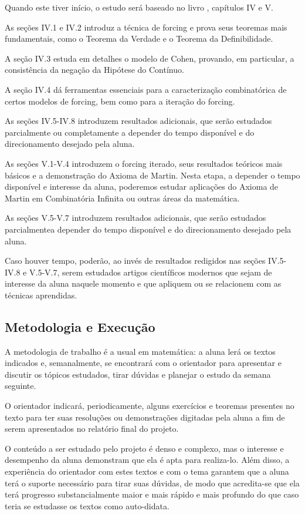 \documentclass{article}
\begin{document}
    Quando este tiver início, o estudo será baseado no livro \cite{kunen2011set}, capítulos IV e V.

    As seções IV.1 e IV.2 introduz a técnica de forcing e prova seus teoremas mais fundamentais, como o Teorema da Verdade e o Teorema da Definibilidade.
    
    A seção IV.3 estuda em detalhes o modelo de Cohen, provando, em particular, a consistência da negação da Hipótese do Contínuo.

    A seção IV.4 dá ferramentas essenciais para a caracterização combinatórica de certos modelos de forcing, bem como para a iteração do forcing.

    As seções IV.5-IV.8 introduzem resultados adicionais, que serão estudados parcialmente ou completamente a depender do tempo disponível e do direcionamento desejado pela aluna.

    As seções V.1-V.4 introduzem o forcing iterado, seus resultados teóricos mais básicos e a demonstração do Axioma de Martin. Nesta etapa, a depender o tempo disponível e interesse da aluna, poderemos estudar aplicações do Axioma de Martin em Combinatória Infinita ou outras áreas da matemática.

    As seções V.5-V.7 introduzem resultados adicionais, que serão estudados parcialmentea depender do tempo disponível e do direcionamento desejado pela aluna.

    Caso houver tempo, poderão, ao invés de resultados redigidos nas seções IV.5-IV.8 e V.5-V.7, serem estudados artigos científicos modernos que sejam de interesse da aluna naquele momento e que apliquem ou se relacionem com as técnicas aprendidas.

    \subsection{Metodologia e Execução}
    A metodologia de trabalho é a usual em matemática: a aluna lerá os textos indicados e, semanalmente, se encontrará com o orientador para apresentar e discutir os tópicos estudados, tirar dúvidas e planejar o estudo da semana seguinte.

    O orientador indicará, periodicamente, alguns exercícios e teoremas presentes no texto para ter suas resoluções ou demonstrações digitadas pela aluna a fim de serem apresentados no relatório final do projeto.

    O conteúdo a ser estudado pelo projeto é denso e complexo, mas o interesse e desempenho da aluna demonstram que ela é apta para realiza-lo.
    Além disso, a experiência do orientador com estes textos e com o tema garantem que a aluna terá o suporte necessário para tirar suas dúvidas, de modo que acredita-se que ela terá progresso substancialmente maior e mais rápido e mais profundo do que caso teria se estudasse os textos como auto-didata.
\end{document}
